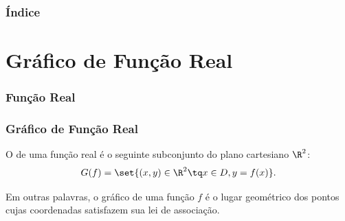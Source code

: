 \documentclass[10pt]{beamer}
\begin{document}
	


	{\backgroundimage\begin{frame}[plain]
		\titlepage
	\end{frame}}



	\begin{frame}
		\frametitle{Índice}
		\tableofcontents
	\end{frame}



	
	
	
	
	
	
	
	
	
	
	
	
	

\section{Gráfico de Função Real}
\begin{frame} \frametitle{Função Real}




\end{frame}


\begin{frame}
\frametitle{Gráfico de Função Real} 

\begin{definicao}
O  de uma função real é o seguinte subconjunto do plano
cartesiano $\R^2$: $$G(f) = \set{(x,y) \in \R^2 \tq x \in D , y =
f(x)}.$$
\end{definicao}
Em outras palavras, o gráfico de uma função $f$ é o lugar geométrico
dos pontos cujas coordenadas satisfazem sua lei de associação.

\end{frame}
\end{document}
